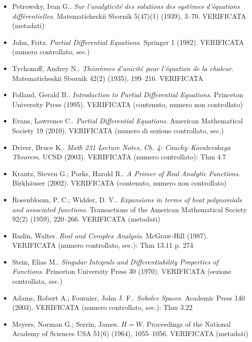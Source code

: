 \begin{itemize}[itemsep=2pt,leftmargin=1.2em,font=\small]
\item Petrowsky, Ivan G.. \emph{Sur l'analyticit{\'e} des solutions des syst{\`e}mes d'{\'e}quations diff{\'e}rentielles}. Matematicheskii Sbornik 5(47)(1) (1939), 3--70. \textsf{\footnotesize VERIFICATA (metadati)}
\item John, Fritz. \emph{Partial Differential Equations}. Springer 1 (1982). \textsf{\footnotesize VERIFICATA (numero controllato, sec.)}
\item Tychonoff, Andrey N.. \emph{Th{\'e}or{\`e}mes d'unicit{\'e} pour l'{\'e}quation de la chaleur}. Matematicheskii Sbornik 42(2) (1935), 199--216. \textsf{\footnotesize VERIFICATA}
\item Folland, Gerald B.. \emph{Introduction to Partial Differential Equations}. Princeton University Press (1995). \textsf{\footnotesize VERIFICATA (contenuto, numero non controllato)}
\item Evans, Lawrence C.. \emph{Partial Differential Equations}. American Mathematical Society 19 (2010). \textsf{\footnotesize VERIFICATA (numero di sezione controllato, sec.)}
\item Driver, Bruce K.. \emph{Math 231 Lecture Notes, Ch. 4: Cauchy--Kovalevskaya Theorem}. UCSD (2003). \textsf{\footnotesize VERIFICATA (numero controllato): Thm 4.7}
\item Krantz, Steven G.; Parks, Harold R.. \emph{A Primer of Real Analytic Functions}. Birkh{\"a}user (2002). \textsf{\footnotesize VERIFICATA (contenuto, numero non controllato)}
\item Rosenbloom, P. C.; Widder, D. V.. \emph{Expansions in terms of heat polynomials and associated functions}. Transactions of the American Mathematical Society 92(2) (1959), 220--266. \textsf{\footnotesize VERIFICATA (metadati)}
\item Rudin, Walter. \emph{Real and Complex Analysis}. McGraw-Hill (1987). \textsf{\footnotesize VERIFICATA (numero controllato, sec.): Thm 13.11 p. 274}
\item Stein, Elias M.. \emph{Singular Integrals and Differentiability Properties of Functions}. Princeton University Press 30 (1970). \textsf{\footnotesize VERIFICATA (sezione controllata, sec.)}
\item Adams, Robert A.; Fournier, John J. F.. \emph{Sobolev Spaces}. Academic Press 140 (2003). \textsf{\footnotesize VERIFICATA (numero controllato, sec.): Thm 3.22}
\item Meyers, Norman G.; Serrin, James. \emph{{$H=W$}}. Proceedings of the National Academy of Sciences USA 51(6) (1964), 1055--1056. \textsf{\footnotesize VERIFICATA (metadati)}

\end{itemize}
